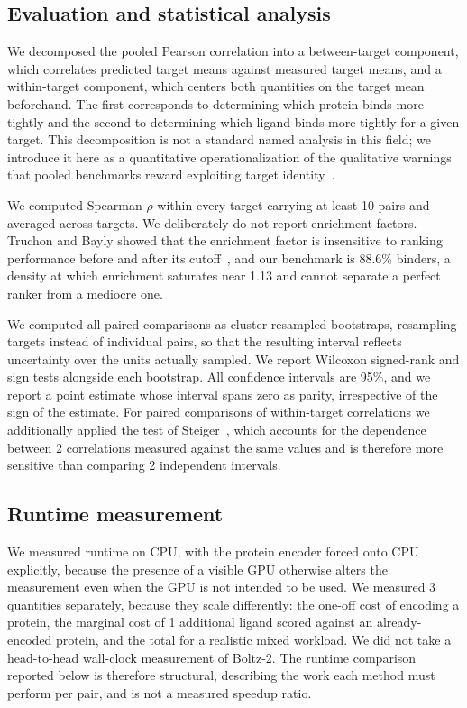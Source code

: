 \documentclass[times, twoside]{zHenriquesLab-StyleBioRxiv}
\begin{document}
\subsection*{Evaluation and statistical analysis}

We decomposed the pooled Pearson correlation into a between-target component, which correlates predicted target means against measured target means, and a within-target component, which centers both quantities on the target mean beforehand. The first corresponds to determining which protein binds more tightly and the second to determining which ligand binds more tightly for a given target. This decomposition is not a standard named analysis in this field; we introduce it here as a quantitative operationalization of the qualitative warnings that pooled benchmarks reward exploiting target identity~\cite{chen2019dude,wallach2018memorization,sieg2019bias,volkov2022frustration}.

We computed Spearman $\rho$ within every target carrying at least 10 pairs and averaged across targets. We deliberately do not report enrichment factors. Truchon and Bayly showed that the enrichment factor is insensitive to ranking performance before and after its cutoff~\cite{truchon2007bedroc}, and our benchmark is 88.6\% binders, a density at which enrichment saturates near 1.13 and cannot separate a perfect ranker from a mediocre one.

We computed all paired comparisons as cluster-resampled bootstraps, resampling targets instead of individual pairs, so that the resulting interval reflects uncertainty over the units actually sampled. We report Wilcoxon signed-rank and sign tests alongside each bootstrap. All confidence intervals are 95\%, and we report a point estimate whose interval spans zero as parity, irrespective of the sign of the estimate. For paired comparisons of within-target correlations we additionally applied the test of Steiger~\cite{steiger1980}, which accounts for the dependence between 2 correlations measured against the same values and is therefore more sensitive than comparing 2 independent intervals.

\subsection*{Runtime measurement}

We measured runtime on CPU, with the protein encoder forced onto CPU explicitly, because the presence of a visible GPU otherwise alters the measurement even when the GPU is not intended to be used. We measured 3 quantities separately, because they scale differently: the one-off cost of encoding a protein, the marginal cost of 1 additional ligand scored against an already-encoded protein, and the total for a realistic mixed workload. We did not take a head-to-head wall-clock measurement of Boltz-2. The runtime comparison reported below is therefore structural, describing the work each method must perform per pair, and is not a measured speedup ratio.
\end{document}
